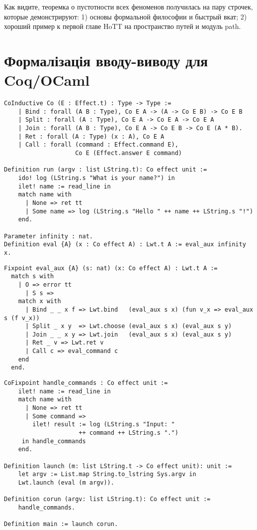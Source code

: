 Как видите, теоремка о пустотности всех феноменов получилась на пару
строчек, которые демонстрируют: 1) основы формальной философии и быстрый вкат;
2) хороший пример к первой главе HoTT на пространство путей и модуль path.

\newpage
\section{Формалізація вводу-виводу для Coq/OCaml}

\begin{lstlisting}
CoInductive Co (E : Effect.t) : Type -> Type :=
    | Bind : forall (A B : Type), Co E A -> (A -> Co E B) -> Co E B
    | Split : forall (A : Type), Co E A -> Co E A -> Co E A
    | Join : forall (A B : Type), Co E A -> Co E B -> Co E (A * B).
    | Ret : forall (A : Type) (x : A), Co E A
    | Call : forall (command : Effect.command E),
                    Co E (Effect.answer E command)

Definition run (argv : list LString.t): Co effect unit :=
    ido! log (LString.s "What is your name?") in
    ilet! name := read_line in
    match name with
      | None => ret tt
      | Some name => log (LString.s "Hello " ++ name ++ LString.s "!")
    end.

Parameter infinity : nat.
Definition eval {A} (x : Co effect A) : Lwt.t A := eval_aux infinity x.
\end{lstlisting}

\begin{lstlisting}
Fixpoint eval_aux {A} (s: nat) (x: Co effect A) : Lwt.t A :=
  match s with
    | O => error tt
      | S s =>
    match x with
      | Bind _ _ x f => Lwt.bind   (eval_aux s x) (fun v_x => eval_aux s (f v_x))
      | Split _ x y  => Lwt.choose (eval_aux s x) (eval_aux s y)
      | Join _ _ x y => Lwt.join   (eval_aux s x) (eval_aux s y)
      | Ret _ v => Lwt.ret v
      | Call c => eval_command c
    end
  end.
\end{lstlisting}

\begin{lstlisting}
CoFixpoint handle_commands : Co effect unit :=
    ilet! name := read_line in
    match name with
      | None => ret tt
      | Some command =>
        ilet! result := log (LString.s "Input: "
                     ++ command ++ LString.s ".")
     in handle_commands
    end.

Definition launch (m: list LString.t -> Co effect unit): unit :=
    let argv := List.map String.to_lstring Sys.argv in
    Lwt.launch (eval (m argv)).

Definition corun (argv: list LString.t): Co effect unit :=
    handle_commands.

Definition main := launch corun.
\end{lstlisting}

